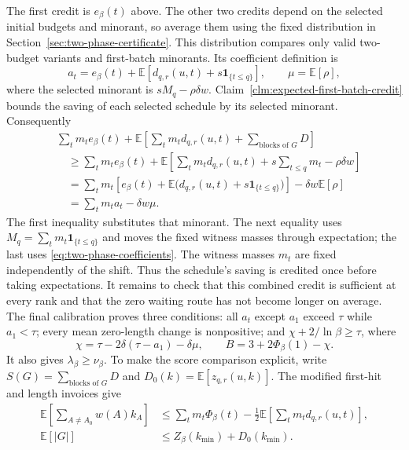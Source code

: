 The first credit is $e_\beta(t)$ above. The other two credits
depend on the selected initial budgets and minorant, so average
them using the fixed distribution in
Section~\ref{sec:two-phase-certificate}. This distribution
compares only valid two-budget variants and first-batch minorants.
Its coefficient definition is
\begin{equation}\label{eq:two-phase-coefficients}
 a_t=e_\beta(t)+\mathbb E[d_{q,r}(u,t)+s\mathbf1_{\{t\le q\}}],
 \qquad \mu=\mathbb E[\rho],
\end{equation}
where the selected minorant is $sM_q-\rho\delta w$.
Claim~\ref{clm:expected-first-batch-credit} bounds the saving of
each selected schedule by its selected minorant. Consequently
\[
 \begin{aligned}
 &\sum_t m_t e_\beta(t)+
 \mathbb E\left[\sum_t m_t d_{q,r}(u,t)+
                  \sum_{\text{blocks of }G}D\right]\\
 &\quad\ge\sum_t m_t e_\beta(t)+
   \mathbb E\left[\sum_t m_t d_{q,r}(u,t)
                 +s\sum_{t\le q}m_t-\rho\delta w\right]\\
 &\quad=\sum_t m_t\left[e_\beta(t)
       +\mathbb E\bigl(d_{q,r}(u,t)+s\mathbf1_{\{t\le q\}}\bigr)\right]
           -\delta w\mathbb E[\rho]\\
 &\quad=\sum_t m_ta_t-\delta w\mu.
 \end{aligned}
\]
The first inequality substitutes that minorant. The next equality
uses $M_q=\sum_t m_t\mathbf1_{\{t\le q\}}$ and moves the fixed
witness masses through expectation; the last uses
\eqref{eq:two-phase-coefficients}. The witness masses $m_t$ are
fixed independently of the shift. Thus the schedule's saving is
credited once before taking expectations.
It remains to check that this combined credit is sufficient at
every rank and that the zero waiting route has not become longer
on average. The final calibration proves three conditions: all $a_t$
except $a_1$ exceed $\tau$ while $a_1<\tau$; every mean zero-length change is
nonpositive; and $\chi+2/\ln\beta\ge\tau$, where
\begin{equation}\label{eq:two-phase-chi-B}
 \chi=\tau-2\delta(\tau-a_1)-\delta\mu,\qquad
 B=3+2\Phi_\beta(1)-\chi.
\end{equation}
It also gives $\lambda_\beta\ge\nu_\beta$.
To make the score comparison explicit, write
$S(G)=\sum_{\text{blocks of }G}D$ and
$D_0(k)=\mathbb E[z_{q,r}(u,k)]$. The modified first-hit and length
invoices give
\[
 \begin{aligned}
 \mathbb E\left[\sum_{A\ne A_0}w(A)k_A\right]
 &\le\sum_t m_t\Phi_\beta(t)
          -\frac12\mathbb E\left[\sum_t m_t d_{q,r}(u,t)\right],\\
 \mathbb E[|G|]&\le Z_\beta(k_{\min})+D_0(k_{\min}).
 \end{aligned}
\]
